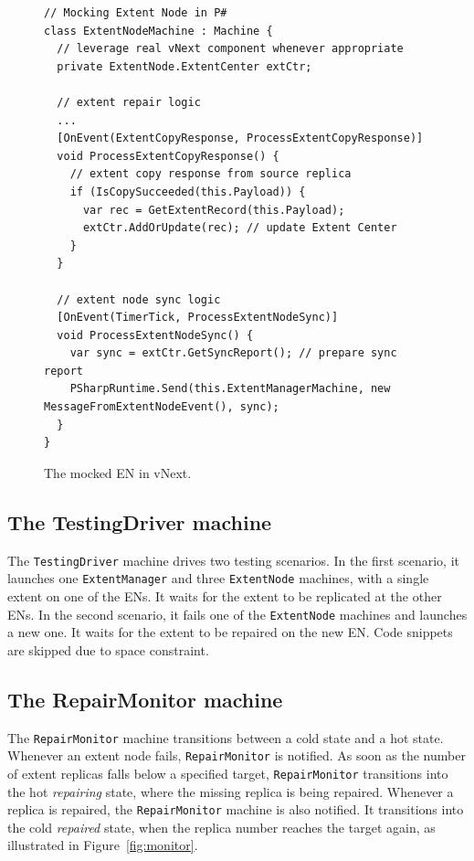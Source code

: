 \begin{figure}[t]
\begin{lstlisting}
// Mocking Extent Node in P#
class ExtentNodeMachine : Machine {
  // leverage real vNext component whenever appropriate
  private ExtentNode.ExtentCenter extCtr;

  // extent repair logic
  ...
  [OnEvent(ExtentCopyResponse, ProcessExtentCopyResponse)]
  void ProcessExtentCopyResponse() {
    // extent copy response from source replica
    if (IsCopySucceeded(this.Payload)) {
      var rec = GetExtentRecord(this.Payload);
      extCtr.AddOrUpdate(rec); // update Extent Center
    }
  }

  // extent node sync logic
  [OnEvent(TimerTick, ProcessExtentNodeSync)]
  void ProcessExtentNodeSync() {
    var sync = extCtr.GetSyncReport(); // prepare sync report
    PSharpRuntime.Send(this.ExtentManagerMachine, new MessageFromExtentNodeEvent(), sync);
  }
}
\end{lstlisting}
\vspace{-2mm}
\caption{The mocked EN in vNext.}
\label{fig:mocked_en}
\end{figure}

\subsection{The TestingDriver machine}
\label{sec:method:driver}

The \texttt{TestingDriver} machine drives two testing scenarios. In the first scenario, it launches one \texttt{ExtentManager} and three \texttt{ExtentNode} machines, with a single extent on one of the ENs. It waits for the extent to be replicated at the other ENs. In the second scenario, it fails one of the \texttt{ExtentNode} machines and launches a new one. It waits for the extent to be repaired on the new EN. Code snippets are skipped due to space constraint.

\subsection{The RepairMonitor machine}
\label{sec:method:monitor}

The \texttt{RepairMonitor} machine transitions between a cold state and a hot state. Whenever an extent node fails, \texttt{RepairMonitor} is notified. As soon as the number of extent replicas falls below a specified target, \texttt{RepairMonitor} transitions into the hot \emph{repairing} state, where the missing replica is being repaired. Whenever a replica is repaired, the \texttt{RepairMonitor} machine is also notified. It transitions into the cold \emph{repaired} state, when the replica number reaches the target again, as illustrated in Figure~\ref{fig:monitor}.

